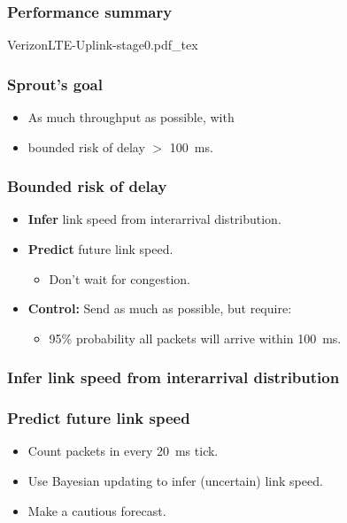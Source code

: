 \documentclass[svgnames]{beamer}
\begin{document}
\begin{frame}
\frametitle{Performance summary}
\vspace{-1 cm}
\def\svgwidth{\columnwidth}\footnotesize{VerizonLTE-Uplink-stage0.pdf_tex}
\end{frame}

\begin{frame}
\frametitle{Sprout's goal}

\begin{itemize}
\item As much throughput as possible, with
\item bounded risk of delay $>$ 100~ms.
\end{itemize}

\end{frame}

\begin{frame}
\frametitle{Bounded risk of delay}
\begin{itemize}

\item \textbf{Infer} link speed from interarrival distribution.

\item \textbf{Predict} future link speed.

\begin{itemize}
\item Don't wait for congestion.
\end{itemize}

\item \textbf{Control:} Send as much as possible, but require:

\begin{itemize}

\item 95\% probability all packets will arrive within 100~ms.

\end{itemize}

\end{itemize}

\end{frame}

\begin{frame}
\frametitle{Infer link speed from interarrival distribution}

\def\svgwidth{0.7 \columnwidth}

\end{frame}

\begin{frame}
\frametitle{Predict future link speed}

\begin{itemize}
\item Count packets in every 20~ms tick.

\item Use Bayesian updating to infer (uncertain) link speed.

\item Make a cautious forecast.
\end{itemize}

\end{frame}
\end{document}
